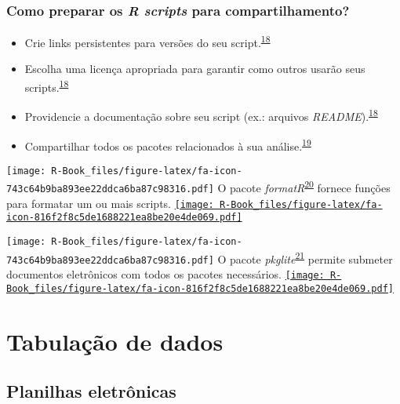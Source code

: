 \documentclass[
]{book}
\begin{document}
\hypertarget{como-preparar-os-r-scripts-para-compartilhamento}{%
\subsection{\texorpdfstring{Como preparar os \emph{R scripts} para compartilhamento?}{Como preparar os R scripts para compartilhamento?}}\label{como-preparar-os-r-scripts-para-compartilhamento}}

\begin{itemize}
\item
  Crie links persistentes para versões do seu script.\textsuperscript{\protect\hyperlink{ref-Eglen2017}{18}}
\item
  Escolha uma licença apropriada para garantir como outros usarão seus scripts.\textsuperscript{\protect\hyperlink{ref-Eglen2017}{18}}
\item
  Providencie a documentação sobre seu script (ex.: arquivos \emph{README}).\textsuperscript{\protect\hyperlink{ref-Eglen2017}{18}}
\item
  Compartilhar todos os pacotes relacionados à sua análise.\textsuperscript{\protect\hyperlink{ref-Zhao2023}{19}}
\end{itemize}

\texttt{[image: R-Book\_files/figure-latex/fa-icon-743c64b9ba893ee22ddca6ba87c98316.pdf]} O pacote \emph{formatR}\textsuperscript{\protect\hyperlink{ref-formatR}{20}} fornece funções para formatar um ou mais scripts. \href{https://cran.r-project.org/web/packages/formatR/index.html}{\texttt{[image: R-Book\_files/figure-latex/fa-icon-816f2f8c5de1688221ea8be20e4de069.pdf]}}

\texttt{[image: R-Book\_files/figure-latex/fa-icon-743c64b9ba893ee22ddca6ba87c98316.pdf]} O pacote \emph{pkglite}\textsuperscript{\protect\hyperlink{ref-pkglite}{21}} permite submeter documentos eletrônicos com todos os pacotes necessários. \href{https://cran.rstudio.com/web/packages/pkglite/index.html}{\texttt{[image: R-Book\_files/figure-latex/fa-icon-816f2f8c5de1688221ea8be20e4de069.pdf]}}

\hypertarget{tabulacao-dados}{%
\chapter{\texorpdfstring{\textbf{Tabulação de dados}}{Tabulação de dados}}\label{tabulacao-dados}}

\hypertarget{planilhas}{%
\section{Planilhas eletrônicas}\label{planilhas}}
\end{document}
